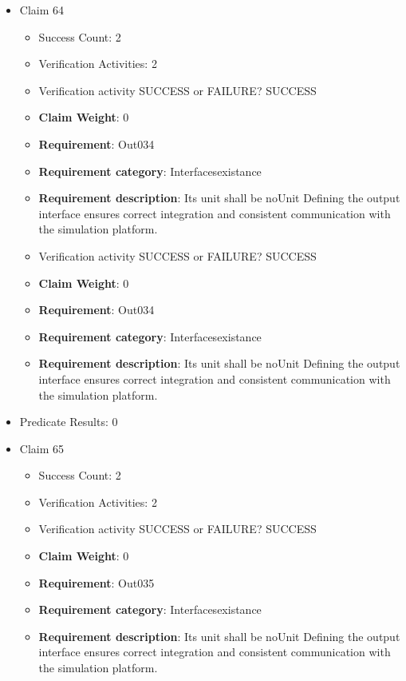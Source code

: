 \documentclass{article}
\begin{document}
\begin{itemize}
  				  \item Claim 64
				\begin{itemize}
			    	\item Success Count: 2 
			    	\item Verification Activities: 2
					\item Verification activity SUCCESS or FAILURE? SUCCESS
					\item \textbf{Claim Weight}: 0
						\item \textbf{Requirement}: Out034 
						\item \textbf{Requirement category}: Interfacesexistance 
						\item \textbf{Requirement description}: Its unit shall be noUnit Defining the output interface ensures correct integration and consistent communication with the simulation platform.
					
					\item Verification activity SUCCESS or FAILURE? SUCCESS
					\item \textbf{Claim Weight}: 0
						\item \textbf{Requirement}: Out034 
						\item \textbf{Requirement category}: Interfacesexistance 
						\item \textbf{Requirement description}: Its unit shall be noUnit Defining the output interface ensures correct integration and consistent communication with the simulation platform.
					
				\end{itemize}
				
									    
				\item Predicate Results: 0

  				  \item Claim 65
				\begin{itemize}
			    	\item Success Count: 2 
			    	\item Verification Activities: 2
					\item Verification activity SUCCESS or FAILURE? SUCCESS
					\item \textbf{Claim Weight}: 0
						\item \textbf{Requirement}: Out035 
						\item \textbf{Requirement category}: Interfacesexistance 
						\item \textbf{Requirement description}: Its unit shall be noUnit Defining the output interface ensures correct integration and consistent communication with the simulation platform.
					

\end{itemize}
\end{itemize}
\end{document}
